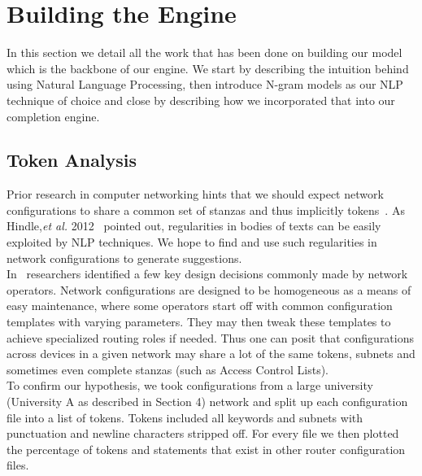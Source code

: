 \section{Building the Engine}

In this section we detail all the work that has been done on building our model which is the backbone of our engine. We start by describing the intuition behind using Natural Language Processing, then introduce N-gram models as our NLP technique of choice and close by describing how we incorporated that into our completion engine.

\subsection{Token Analysis}
Prior research in computer networking hints that we should expect network configurations to share a common set of stanzas and thus implicitly tokens~\cite{Benson}. As Hindle,\textit{et al.} 2012~\cite{naturalness} pointed out, regularities in bodies of texts can be easily exploited by NLP techniques. We hope to find and use such regularities in network configurations to generate suggestions.\\

In~\cite{complexity} researchers identified a few key design decisions commonly made by network operators. Network configurations are designed to be homogeneous as a means of easy maintenance, where some operators start off with common configuration templates with varying parameters. They may then tweak these templates to achieve specialized routing roles if needed. Thus one can posit that configurations across devices in a given network may share a lot of the same tokens, subnets and sometimes even complete stanzas (such as Access Control Lists).\\ 

To confirm our hypothesis, we took configurations from a large university (University A as described in Section 4) network and split up each configuration file into a list of tokens. Tokens included all keywords and subnets with punctuation and newline characters stripped off. For every file we then plotted the percentage of tokens and statements that exist in other router configuration files.

